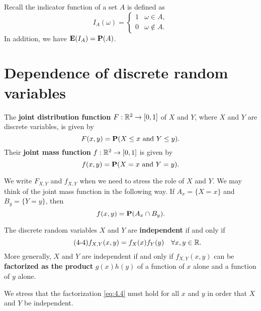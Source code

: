 Recall the indicator function of a set $A$ is defined as
\begin{equation*}
    I_A(\omega) = \begin{cases} 1 & \omega \in A, \\
    0 & \omega \not\in A. \end{cases}
\end{equation*}
In addition, we have $\mathbf{E}(I_A) = \mathbf{P}(A)$.


\section{Dependence of discrete random variables}
\begin{definition}
The \textbf{joint distribution function} $F:\mathbb{R}^2 \to [0,1]$ of $X$ and $Y$, where $X$ and $Y$ are discrete variables, is given by 
\begin{equation*}
    F(x, y) = \mathbf{P}(X\leq x \text{ and } Y \leq y). 
\end{equation*}
Their \textbf{joint mass function} $f:\mathbb{R}^2 \to [0,1]$ is given by 
\begin{equation*}
    f(x,y) = \mathbf{P}(X = x \text{ and } Y = y). 
\end{equation*}
\end{definition}

We write $F_{X,Y}$ and $f_{X,Y}$ when we need to stress the role of $X$ and $Y$. We may think of the joint mass function in the following way. If $A_x = \{X = x\}$ and $B_y = \{Y = y\}$, then 
\begin{equation*}
    f(x,y) = \mathbf{P}(A_x \cap B_y).
\end{equation*}

\begin{lemma}
The discrete random variables $X$ and $Y$ are \textbf{independent} if and only if 
\begin{equation}
    \label{eq:4.4}
    \tag{4-4}
    f_{X,Y}(x,y) = f_X(x)f_Y(y) \quad \forall x,y \in \mathbb{R}.
\end{equation}
More generally, $X$ and $Y$ are independent if and only if $f_{X,Y}(x, y)$ can be \textbf{factorized as the product} $g(x)h (y)$ of a function of $x$ alone and a function of $y$ alone. 
\end{lemma}
\begin{remark}
We stress that the factorization \eqref{eq:4.4} must hold for all $x$ and $y$ in order that $X$ and $Y$ be independent. 
\end{remark}


